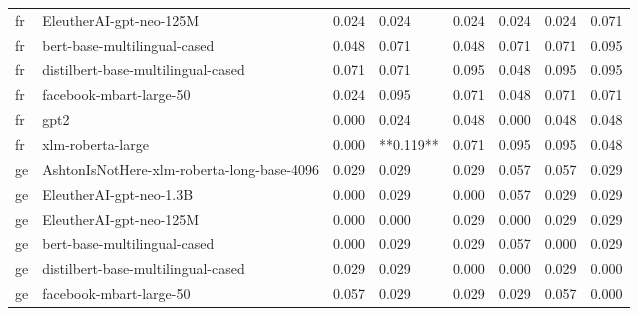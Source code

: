 \begin{tabular}{llllllll}
      fr &                    EleutherAI-gpt-neo-125M & 0.024 &                     0.024 &                 0.024 &                  0.024 &                                   0.024 &     0.071 \\
      fr &               bert-base-multilingual-cased & 0.048 &                     0.071 &                 0.048 &                  0.071 &                                   0.071 &     0.095 \\
      fr &         distilbert-base-multilingual-cased & 0.071 &                     0.071 &                 0.095 &                  0.048 &                                   0.095 &     0.095 \\
      fr &                    facebook-mbart-large-50 & 0.024 &                     0.095 &                 0.071 &                  0.048 &                                   0.071 &     0.071 \\
      fr &                                       gpt2 & 0.000 &                     0.024 &                 0.048 &                  0.000 &                                   0.048 &     0.048 \\
      fr &                          xlm-roberta-large & 0.000 &                 **0.119** &                 0.071 &                  0.095 &                                   0.095 &     0.048 \\
      ge & AshtonIsNotHere-xlm-roberta-long-base-4096 & 0.029 &                     0.029 &                 0.029 &                  0.057 &                                   0.057 &     0.029 \\
      ge &                    EleutherAI-gpt-neo-1.3B & 0.000 &                     0.029 &                 0.000 &                  0.057 &                                   0.029 &     0.029 \\
      ge &                    EleutherAI-gpt-neo-125M & 0.000 &                     0.000 &                 0.029 &                  0.000 &                                   0.029 &     0.029 \\
      ge &               bert-base-multilingual-cased & 0.000 &                     0.029 &                 0.029 &                  0.057 &                                   0.000 &     0.029 \\
      ge &         distilbert-base-multilingual-cased & 0.029 &                     0.029 &                 0.000 &                  0.000 &                                   0.029 &     0.000 \\
      ge &                    facebook-mbart-large-50 & 0.057 &                     0.029 &                 0.029 &                  0.029 &                                   0.057 &     0.000 \\

\end{tabular}
